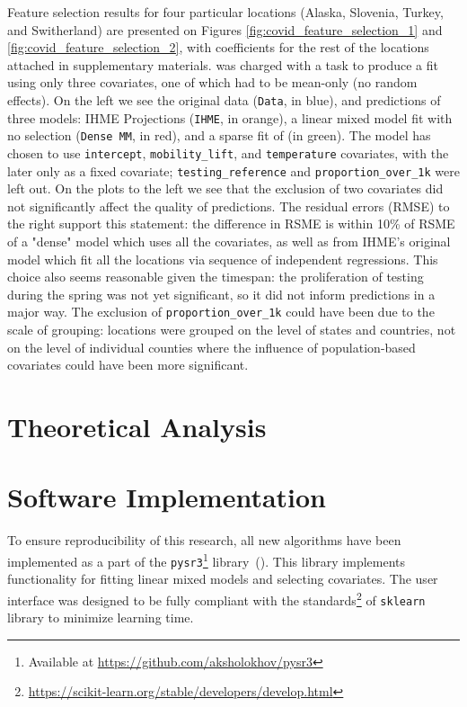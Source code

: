 Feature selection results for four particular locations (Alaska, Slovenia, Turkey, and Switherland) are presented on Figures \ref{fig:covid_feature_selection_1} and \ref{fig:covid_feature_selection_2}, with coefficients for the rest of the locations attached in supplementary materials. \ouralgo was charged with a task to produce a fit using only three covariates, one of which had to be mean-only (no random effects). On the left we see the original data (\texttt{Data}, in {\color{blue} blue}), and predictions of three models: IHME Projections (\texttt{IHME}, in {\color{orange} orange}), a linear mixed model fit with no selection (\texttt{Dense MM}, in {\color{red} red}), and a sparse fit of \ouralgo (\ouralgo in {\color{green} green}). The \ouralgo model has chosen to use \texttt{intercept}, \texttt{mobility\_lift}, and \texttt{temperature} covariates, with the later only as a fixed covariate; \texttt{testing\_reference} and \texttt{proportion\_over\_1k} were left out. On the plots to the left we see that the exclusion of two covariates did not significantly affect the quality of predictions. The residual errors (RMSE) to the right support this statement: the difference in RSME is within 10\% of RSME of a "dense" model which uses all the covariates, as well as from IHME's original model which fit all the locations via sequence of independent regressions. This choice also seems reasonable given the timespan: the proliferation of testing during the spring was not yet significant, so it did not inform predictions in a major way. The exclusion of \texttt{proportion\_over\_1k} could have been due to the scale of grouping: locations were grouped on the level of states and countries, not on the level of individual counties where the influence of population-based covariates could have been more significant. 

\section{Theoretical Analysis}
\label{sec:theory-paper}


\section{Software Implementation}
\label{sec:software-paper}
To ensure reproducibility of this research, all new algorithms have been implemented as a part of the \texttt{pysr3}\footnote{Available at \href{https://github.com/aksholokhov/pysr3}{https://github.com/aksholokhov/pysr3}} library~(\cite{sholokhov2023pysr3}). This library implements functionality for fitting linear mixed models and selecting covariates. The user interface was designed to be fully compliant with the standards\footnote{\href{https://scikit-learn.org/stable/developers/develop.html}{https://scikit-learn.org/stable/developers/develop.html}} of \texttt{sklearn} library to minimize learning time. 

